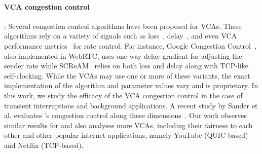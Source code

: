 \paragraph{VCA congestion control}: Several congestion control algorithms have been proposed for VCAs. These algorithms rely on a variety of signals such as loss~\cite{handley2003tcp}, delay~\cite{carlucci2016analysis}, and even VCA performance metrics~\cite{singh2012rate} for rate control. For instance, Google Congestion Control~\cite{carlucci2016analysis}, also implemented in WebRTC, uses one-way delay gradient for adjusting the sender rate while SCReAM~\cite{johansson2015self} relies on both loss and delay along with TCP-like self-clocking. %
While the VCAs may use one or more of these variants, the exact implementation of the algorithm and parameter values vary and is proprietary. In this work, we study the efficacy of the VCA congestion control in the case of transient interruptions and background applications. A recent study by Sander et al. evaluates \zoom's congestion control along these dimensions~\cite{sandervideo}. Our work observes similar results for \zoom and also analyses more VCAs, including their fairness to each other and other popular internet applications, namely YouTube (QUIC-based) and Netflix (TCP-based). 


\begin{comment}
\paragraph{Performance of Internet applications}
There is also related work on measuring other applications over the Internet including video streaming~\cite{}, web browsing~\cite{}, and online gaming~\cite{}. Our work focuses on VCAs which are characterized by their strict latency requirements and upstream link utilization.  
\end{comment}
